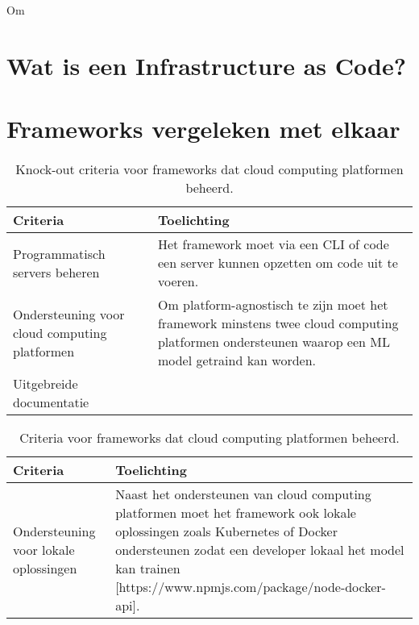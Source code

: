 Om 

\section{Wat is een Infrastructure as Code?}\label{subsec:ch5-wat-is-een-infrastructure-as-code}

\section{Frameworks vergeleken met elkaar}\label{subsec:ch5-frameworks-vergeleken-met-elkaar}


\begin{table}[hbt!]
  \centering
  \begin{tabular}{|p{.2\linewidth}|p{.69\linewidth}|}
  \hline
  \textbf{Criteria} & \textbf{Toelichting} \\ \hline
    Programmatisch servers beheren
    &
    Het framework moet via een CLI of code een server kunnen opzetten om code uit te voeren. 
    \\ \hline

    Ondersteuning voor cloud \newline computing \newline platformen
    &
    Om platform-agnostisch te zijn moet het framework minstens twee cloud computing platformen ondersteunen waarop een ML model getraind kan worden.
    \\ \hline

    Uitgebreide documentatie
    &
    
    \\ \hline
  \end{tabular}
  \caption{Knock-out criteria voor frameworks dat cloud computing platformen beheerd.}
  \label{table:knock-out-criteria-framworks-that-manage-cloud-computing-platformen}
\end{table}

\begin{table}[hbt!]
  \centering
  \begin{tabular}{|p{.2\linewidth}|p{.69\linewidth}|}
  \hline
  \textbf{Criteria} & \textbf{Toelichting} \\ \hline
    Ondersteuning voor lokale \newline oplossingen
    &
    Naast het ondersteunen van cloud computing platformen moet het framework ook lokale oplossingen zoals Kubernetes of Docker ondersteunen zodat een developer lokaal het model kan trainen [https://www.npmjs.com/package/node-docker-api].
    \\ \hline
  \end{tabular}
  \caption{Criteria voor frameworks dat cloud computing platformen beheerd.}
  \label{table:criteria-framworks-that-manage-cloud-computing-platformen}
\end{table}

